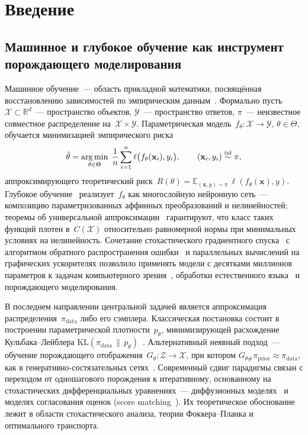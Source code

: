 \section{Введение}

\subsection*{Машинное и глубокое обучение как инструмент порождающего моделирования}

Машинное обучение~--- область прикладной математики, посвящённая восстановлению зависимостей по эмпирическим данным~\cite{vapnik1999overview, hastie2009elements}. Формально пусть~$\mathcal{X}\subset\mathbb{R}^d$~--- пространство объектов, $\mathcal{Y}$~--- пространство ответов, $\pi$~--- неизвестное совместное распределение на~$\mathcal{X}\times\mathcal{Y}$. Параметрическая модель~$f_\theta:\mathcal{X}\to\mathcal{Y}$, $\theta\in\Theta$, обучается минимизацией эмпирического риска
\[
    \hat{\theta} = \operatorname*{arg\,min}_{\theta\in\Theta}\;\frac{1}{n}\sum_{i=1}^n \ell\bigl(f_\theta(\mathbf{x}_i), y_i\bigr), \qquad (\mathbf{x}_i,y_i)\overset{\text{iid}}{\sim}\pi,
\]
аппроксимирующего теоретический риск~$R(\theta)=\mathbb{E}_{(\mathbf{x},y)\sim\pi}\,\ell(f_\theta(\mathbf{x}),y)$. Глубокое обучение~\cite{lecun2015deep, goodfellow2016deep} реализует~$f_\theta$ как многослойную нейронную сеть~--- композицию параметризованных аффинных преобразований и нелинейностей; теоремы об универсальной аппроксимации~\cite{cybenko1989approximation, hornik1989multilayer, leshno1993multilayer} гарантируют, что класс таких функций плотен в~$C(\mathcal{X})$ относительно равномерной нормы при минимальных условиях на нелинейность. Сочетание стохастического градиентного спуска~\cite{robbins1951stochastic, kingma2014adam} с алгоритмом обратного распространения ошибки~\cite{rumelhart1986learning} и параллельных вычислений на графических ускорителях позволило применять модели с десятками миллионов параметров к задачам компьютерного зрения~\cite{krizhevsky2012imagenet, he2016deep}, обработки естественного языка~\cite{vaswani2017attention, devlin2018bert} и порождающего моделирования.

В последнем направлении центральной задачей является аппроксимация распределения~$\pi_\mathrm{data}$ либо его сэмплера. Классическая постановка состоит в построении параметрической плотности~$p_\theta$, минимизирующей расхождение Кульбака--Лейблера $\mathrm{KL}(\pi_\mathrm{data}\,\|\,p_\theta)$~\cite{kingma2013auto, rezende2014stochastic}. Альтернативный неявный подход~--- обучение порождающего отображения~$G_\theta:\mathcal{Z}\to\mathcal{X}$, при котором $G_{\theta\#}\pi_\mathrm{prior}\approx\pi_\mathrm{data}$, как в генеративно-состязательных сетях~\cite{goodfellow2014generative, arjovsky2017wasserstein}. Современный сдвиг парадигмы связан с переходом от одношагового порождения к итеративному, основанному на стохастических дифференциальных уравнениях~--- диффузионных моделях~\cite{sohl2015deep, ho2020denoising, song2020score} и моделях согласования оценок (score matching~\cite{hyvarinen2005estimation, vincent2011connection}). Их теоретическое обоснование лежит в области стохастического анализа, теории Фоккера--Планка и оптимального транспорта.


